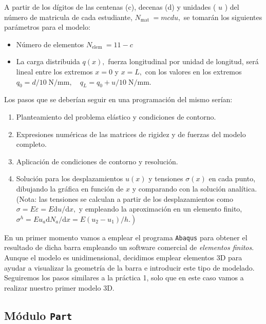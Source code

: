 \documentclass[spanish,a4paper,12pt]{article}
\begin{document}
A partir de los dígitos de las centenas (c), decenas (d) y unidades ( \(u\) ) del número de matricula de cada estudiante, \(N_{\text {mat }}=m c d u,\) se tomarán los siguientes parámetros para el modelo:
\begin{itemize}
\item Número de elementos \(N_{\text {elem }}=11-c\)
\item La carga distribuida \(q(x),\) fuerza longitudinal por unidad de longitud, será lineal entre los extremos \(x=0\) y \(x=L,\) con los valores en los extremos \(q_0=d / 10\; \mathrm{N} / \mathrm{mm}, \quad q_{L}=q_{0}+u / 10 \; \mathrm{N} / \mathrm{mm} \).
\end{itemize}

Los pasos que se deberían seguir en una programación del mismo serían:
\begin{enumerate}
\item Planteamiento del problema elástico y condiciones de contorno.
\item Expresiones numéricas de las matrices de rigidez y de fuerzas del modelo completo.
\item Aplicación de condiciones de contorno y resolución.
\item Solución para los desplazamientos \(u(x)\) y tensiones \(\sigma(x)\) en cada punto, dibujando la gráfica en función de \(x\) y comparando con la solución analítica. (Nota: las tensiones se calculan
a partir de los desplazamientos como \(\sigma=E \varepsilon=E \mathrm{d} u / \mathrm{d} x,\) y empleando la aproximación
en un elemento finito, \(\left.\sigma^{h}=E u_{a} \mathrm{d} N_{a} / \mathrm{d} x=E\left(u_{2}-u_{1}\right) / h .\right)\)
\end{enumerate}

En un primer momento vamos a emplear el programa \texttt{Abaqus} para obtener el resultado de dicha barra empleando un software comercial de \emph{elementos finitos}.
Aunque el modelo es unidimensional, decidimos emplear elementos 3D para ayudar a visualizar la geometría de la barra e introducir este tipo de modelado.
Seguiremos los pasos similares a la práctica 1, solo que en este caso vamos a realizar nuestro primer modelo 3D.

\subsection{Módulo \texttt{Part}}
\end{document}
